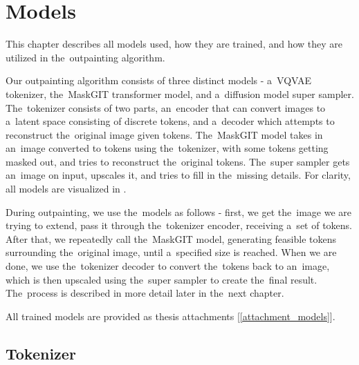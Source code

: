 \chapter{Models} \label{models}


This chapter describes all models used, how they are trained, and how they are utilized in the~outpainting algorithm.

Our outpainting algorithm consists of three distinct models - a~VQVAE tokenizer, the~MaskGIT transformer model, and a~diffusion model super sampler. The~tokenizer consists of two parts, an~encoder that can convert images to a~latent space consisting of discrete tokens, and a~decoder which attempts to reconstruct the~original image given tokens. The~MaskGIT model takes in an~image converted to tokens using the~tokenizer, with some tokens getting masked out, and tries to reconstruct the~original tokens. The~super sampler gets an~image on input, upscales it, and tries to fill in the~missing details. For clarity, all models are visualized in .




During outpainting, we use the~models as follows - first, we get the~image we are trying to extend, pass it through the~tokenizer encoder, receiving a~set of tokens. After that, we repeatedly call the~MaskGIT model, generating feasible tokens surrounding the~original image, until a~specified size is reached. When we are done, we use the~tokenizer decoder to convert the~tokens back to an~image, which is then upscaled using the~super sampler to create the~final result. The~process is described in more detail later in the~next chapter.

All trained models are provided as thesis attachments [\ref{attachment_models}].


\section{Tokenizer}

